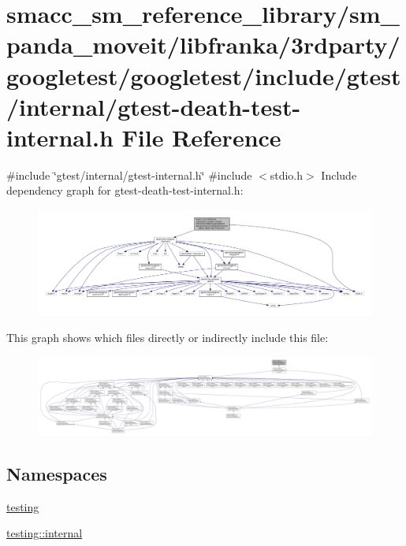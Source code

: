 \hypertarget{gtest-death-test-internal_8h}{}\section{smacc\+\_\+sm\+\_\+reference\+\_\+library/sm\+\_\+panda\+\_\+moveit/libfranka/3rdparty/googletest/googletest/include/gtest/internal/gtest-\/death-\/test-\/internal.h File Reference}
\label{gtest-death-test-internal_8h}
{\ttfamily \#include \char`\"{}gtest/internal/gtest-\/internal.\+h\char`\"{}}\newline
{\ttfamily \#include $<$stdio.\+h$>$}\newline
Include dependency graph for gtest-\/death-\/test-\/internal.h\+:
\nopagebreak
\begin{figure}[H]
\begin{center}
\leavevmode
\includegraphics[width=350pt]{gtest-death-test-internal_8h__incl}
\end{center}
\end{figure}
This graph shows which files directly or indirectly include this file\+:
\nopagebreak
\begin{figure}[H]
\begin{center}
\leavevmode
\includegraphics[width=350pt]{gtest-death-test-internal_8h__dep__incl}
\end{center}
\end{figure}
\subsection*{Namespaces}
\begin{DoxyCompactItemize}
\item 
 \hyperlink{namespacetesting}{testing}
\item 
 \hyperlink{namespacetesting_1_1internal}{testing\+::internal}
\end{DoxyCompactItemize}
